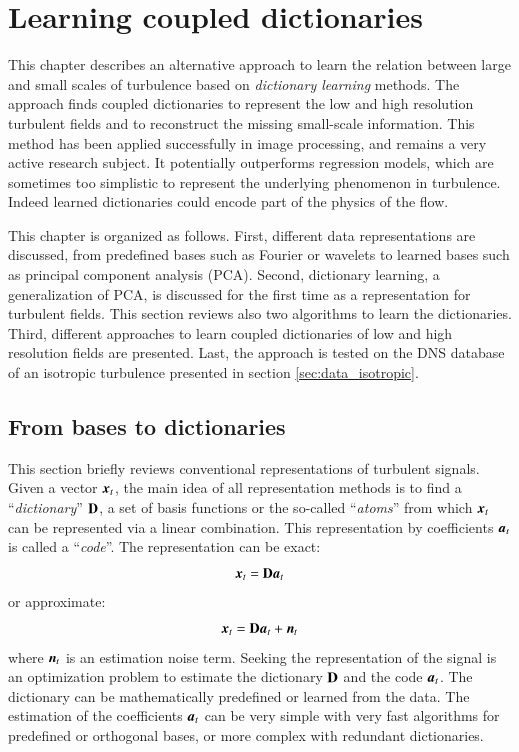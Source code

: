 \chapter{Learning coupled dictionaries}
\label{chap_dictionarylearning} 
This chapter describes an alternative approach to learn the relation between large and small scales of turbulence based on \textit{dictionary learning} methods. The approach finds coupled dictionaries to represent the low and high resolution turbulent fields and to reconstruct the missing small-scale information. This method has been applied successfully in image processing, and remains a very active research subject. It potentially outperforms regression models, which are sometimes too simplistic to represent the underlying phenomenon in turbulence. Indeed learned dictionaries could encode part of the physics of the flow. 

This chapter is organized as follows. First, different data representations are discussed, from predefined bases such as Fourier or wavelets to learned bases such as principal component analysis (PCA). Second, dictionary learning, a generalization of PCA, is discussed for the first time as a representation for turbulent fields. This section reviews also two algorithms to learn the dictionaries. Third, different approaches to learn coupled dictionaries of low and high resolution fields are presented. Last, the approach is tested on the DNS database of an isotropic turbulence presented in section \ref{sec:data_isotropic}. 

\section{From bases to dictionaries}
This section briefly reviews conventional representations of turbulent signals. Given a vector $ \operatorname{\boldsymbol{x}}_t $, the main idea of all representation methods is to find a ``\textit{dictionary}'' $ \mathbf{D} $, a set of basis functions or the so-called ``\textit{atoms}'' from which $ \operatorname{\boldsymbol{x}}_t $ can be represented via a linear combination. This representation by coefficients $ \boldsymbol{a}_t $ is called a ``\textit{code}''. The representation can be exact:
\begin{equation}
\operatorname{\boldsymbol{x}}_t = \mathbf{D} \boldsymbol{a}_t
\end{equation}
or approximate:
\begin{equation}
 \operatorname{\boldsymbol{x}}_t = \mathbf{D} \boldsymbol{a}_t +\operatorname{\boldsymbol{n}}_t
\end{equation}
where $ \operatorname{\boldsymbol{n}}_t $ is an estimation noise term. Seeking the representation of the signal is an optimization problem to estimate the dictionary $ \mathbf{D} $ and the code $ \boldsymbol{a}_t $. The dictionary can be mathematically predefined or learned from the data. The estimation of the coefficients $ \boldsymbol{a}_t $ can be very simple with very fast algorithms for predefined or orthogonal bases, or more complex with redundant dictionaries. 

